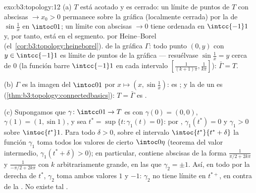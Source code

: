\begin{solution}{exo:b3:topology:12}
(a) $T$ está acotado y es cerrado: un límite de puntos de $T$ con
abscisas $\to x_0 > 0$ permanece sobre la gráfica (localmente cerrada)
por la  de $\sin\frac1x$
en $\intoc01$; un límite con abscisas $\to 0$ tiene ordenada en
$\intcc{-1}1$ y, por tanto, está en el segmento.
 por Heine--Borel
(el~\cref{cor:b3:topology:heineborel}).
 de la gráfica $\Gamma$: todo
punto $(0, y)$ con $y \in \intcc{-1}1$ es límite de puntos de la gráfica
--- resuélvase $\sin\frac1x = y$ cerca de $0$ (la función barre
$\intcc{-1}1$ en cada intervalo
$[\frac1{(k+1)\pi}, \frac1{k\pi}]$): $\bar\Gamma = T$.

(b) $\Gamma$ es la imagen 
del  $\intoc01$ por
$x \mapsto (x, \sin\frac1x)$: es
; y la
 de un
 es
(\cref{thm:b3:topology:connectedbasics}): $T = \bar\Gamma$
es .

(c) Supongamos que $\gamma\colon\intcc01\to T$ es
 con $\gamma(0) = (0,0)$,
$\gamma(1) = (1, \sin1)$, y sea $t^*
= \sup\{t : \gamma_1(t) = 0\}$: por
, $\gamma_1(t^*)
= 0$ y $\gamma_1 > 0$ sobre $\intoc{t^*}1$. Para todo $\delta > 0$,
sobre el intervalo $\intoc{t^*}{t^*+\delta}$ la función $\gamma_1$ toma
todos los valores de cierto $\intoc0\eta$ (teorema del valor intermedio,
$\gamma_1(t^* + \delta) > 0$); en particular, contiene abscisas de la
forma $\frac1{\pi/2 + 2k\pi}$ y $\frac1{-\pi/2 + 2k\pi}$ con $k$
arbitrariamente grande, en las que $\gamma_2 = \pm1$. Así, en todo
 por la derecha de $t^*$,
$\gamma_2$ toma ambos valores $1$ y $-1$: $\gamma_2$ no tiene límite en
$t^{*+}$, en contra de la
. No existe tal
.


\end{solution}
